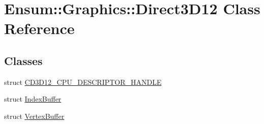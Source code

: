 \hypertarget{class_ensum_1_1_graphics_1_1_direct3_d12}{}\section{Ensum\+:\+:Graphics\+:\+:Direct3\+D12 Class Reference}
\label{class_ensum_1_1_graphics_1_1_direct3_d12}
\subsection*{Classes}
\begin{DoxyCompactItemize}
\item 
struct \hyperlink{struct_ensum_1_1_graphics_1_1_direct3_d12_1_1_c_d3_d12___c_p_u___d_e_s_c_r_i_p_t_o_r___h_a_n_d_l_e}{C\+D3\+D12\+\_\+\+C\+P\+U\+\_\+\+D\+E\+S\+C\+R\+I\+P\+T\+O\+R\+\_\+\+H\+A\+N\+D\+LE}
\item 
struct \hyperlink{struct_ensum_1_1_graphics_1_1_direct3_d12_1_1_index_buffer}{Index\+Buffer}
\item 
struct \hyperlink{struct_ensum_1_1_graphics_1_1_direct3_d12_1_1_vertex_buffer}{Vertex\+Buffer}
\end{DoxyCompactItemize}
